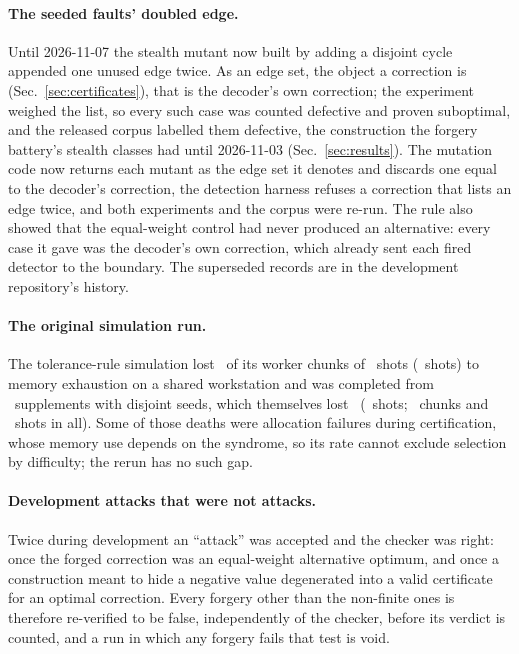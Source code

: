 \documentclass[aps,pra,twocolumn,superscriptaddress,nofootinbib,longbibliography,floatfix]{revtex4-2}
\begin{document}
\paragraph*{The seeded faults' doubled edge.} Until 2026-11-07 the stealth mutant now built by adding a disjoint cycle appended one unused edge twice. As an edge set, the object a correction is (Sec.~\ref{sec:certificates}), that is the decoder's own correction; the experiment weighed the list, so every such case was counted defective and proven suboptimal, and the released corpus labelled them defective, the construction the forgery battery's stealth classes had until 2026-11-03 (Sec.~\ref{sec:results}). The mutation code now returns each mutant as the edge set it denotes and discards one equal to the decoder's correction, the detection harness refuses a correction that lists an edge twice, and both experiments and the corpus were re-run. The rule also showed that the equal-weight control had never produced an alternative: every case it gave was the decoder's own correction, which already sent each fired detector to the boundary. The superseded records are in the development repository's history.

\paragraph*{The original simulation run.} The tolerance-rule simulation lost \SimMainFailedChunks\ of its worker chunks of \SimMainChunkShots\ shots (\SimMainShotsLost\ shots) to memory exhaustion on a shared workstation and was completed from \SimSupplements\ supplements with disjoint seeds, which themselves lost \SimSuppFailedList\ (\SimSuppShotsLost\ shots; \SimFailedChunks\ chunks and \SimShotsLostToChunks\ shots in all). Some of those deaths were allocation failures during certification, whose memory use depends on the syndrome, so its rate cannot exclude selection by difficulty; the rerun has no such gap.

\paragraph*{Development attacks that were not attacks.} Twice during development an ``attack'' was accepted and the checker was right: once the forged correction was an equal-weight alternative optimum, and once a construction meant to hide a negative value degenerated into a valid certificate for an optimal correction. Every forgery other than the non-finite ones is therefore re-verified to be false, independently of the checker, before its verdict is counted, and a run in which any forgery fails that test is void.
\end{document}
